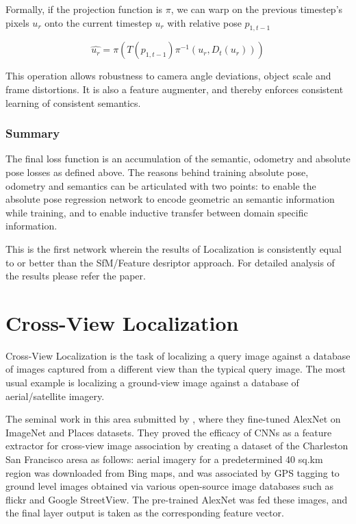 Formally, if the projection function is $\pi$, we can warp on the previous timestep's pixels $u_r$ onto the current timestep $\hat{u_r}$ with relative pose $p_{1,t-1}$

\[\hat{u_r} = \pi(T(p_{1,t-1}) \pi^{-1}(u_r, D_t(u_r)))\]


This operation allows robustness to camera angle deviations, object scale and frame distortions. It is also a feature augmenter, and thereby enforces consistent
learning of consistent semantics.

\subsubsection{Summary}
The final loss function is an accumulation of the semantic, odometry and absolute pose losses as defined above. The reasons behind training absolute pose, odometry and semantics 
can be articulated with two points: to enable the absolute pose regression network to encode geometric an semantic information while training, and to enable inductive
transfer between domain specific information. 

This is the first network wherein the results of Localization is consistently equal to or better than the SfM/Feature desriptor approach. For detailed analysis of the results
please refer the paper. 

\section{Cross-View Localization}
Cross-View Localization is the task of localizing a query image against a database of images captured from a different view than the typical query image. The most usual example is localizing a ground-view image against a database of aerial/satellite imagery.

The seminal work in this area submitted by \cite{Jacobs2015}, where they fine-tuned AlexNet on ImageNet and Places datasets. They proved the efficacy of CNNs as a feature extractor for cross-view image association by creating a dataset of the Charleston San Francisco aresa as follows: aerial imagery for a predetermined 40 sq.km region was downloaded from Bing maps, and was associated by GPS tagging to ground level images obtained via various open-source image databases such as flickr and Google StreetView. The pre-trained AlexNet was fed these images, and the final layer output is taken as the corresponding feature vector. 

